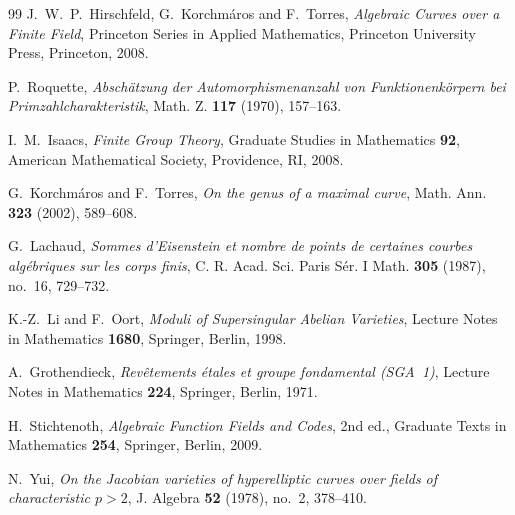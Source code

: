 \documentclass[11pt]{amsart}
\theoremstyle{remark}
\begin{document}
\begin{thebibliography}{99}
J.~W.~P.~Hirschfeld, G.~Korchm\'aros and F.~Torres,
\emph{Algebraic Curves over a Finite Field},
Princeton Series in Applied Mathematics,
Princeton University Press, Princeton, 2008.

P.~Roquette,
\emph{Absch\"atzung der Automorphismenanzahl von Funktionenk\"orpern bei Primzahlcharakteristik},
Math. Z. \textbf{117} (1970), 157--163.

I.~M.~Isaacs,
\emph{Finite Group Theory},
Graduate Studies in Mathematics \textbf{92},
American Mathematical Society, Providence, RI, 2008.

G.~Korchm\'aros and F.~Torres,
\emph{On the genus of a maximal curve},
Math. Ann. \textbf{323} (2002), 589--608.

G.~Lachaud,
\emph{Sommes d'Eisenstein et nombre de points de certaines courbes
alg\'ebriques sur les corps finis},
C. R. Acad. Sci. Paris S\'er. I Math. \textbf{305} (1987), no.~16,
729--732.

K.-Z.~Li and F.~Oort,
\emph{Moduli of Supersingular Abelian Varieties},
Lecture Notes in Mathematics \textbf{1680}, Springer, Berlin, 1998.

A.~Grothendieck,
\emph{Rev\^etements \'etales et groupe fondamental (SGA~1)},
Lecture Notes in Mathematics \textbf{224}, Springer, Berlin, 1971.

H.~Stichtenoth,
\emph{Algebraic Function Fields and Codes},
2nd ed., Graduate Texts in Mathematics \textbf{254},
Springer, Berlin, 2009.

N.~Yui,
\emph{On the Jacobian varieties of hyperelliptic curves over fields of
characteristic $p>2$},
J. Algebra \textbf{52} (1978), no.~2, 378--410.

\end{thebibliography}
\end{document}
